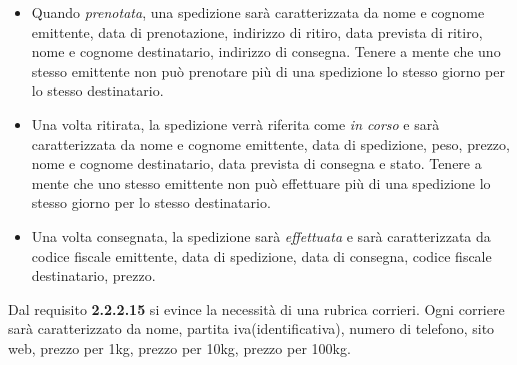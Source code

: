 \documentclass[a4paper,12pt]{article}
\begin{document}
\begin{itemize}
  \item Quando \textit{prenotata}, una spedizione sarà caratterizzata da nome e cognome emittente, data di prenotazione, indirizzo di ritiro, data prevista di ritiro,
    nome e cognome destinatario, indirizzo di consegna. Tenere a mente che uno stesso emittente non può prenotare più di una spedizione lo stesso giorno per lo 
    stesso destinatario.

  \item Una volta ritirata, la spedizione verrà riferita come \textit{in corso} e sarà caratterizzata da nome e cognome emittente, data di spedizione, peso, prezzo,
    nome e cognome destinatario, data prevista di consegna e stato. Tenere a mente che uno stesso emittente non può effettuare più di una spedizione lo stesso giorno 
    per lo stesso destinatario.

  \item Una volta consegnata, la spedizione sarà \textit{effettuata} e sarà caratterizzata da codice fiscale emittente, data di spedizione, data di consegna, codice fiscale
    destinatario, prezzo.
\end{itemize}  
Dal requisito \textbf{2.2.2.15} si evince la necessità di una rubrica corrieri. Ogni corriere sarà caratterizzato da nome, partita iva(identificativa), numero di telefono, sito web,
prezzo per 1kg, prezzo per 10kg, prezzo per 100kg.
\end{document}
